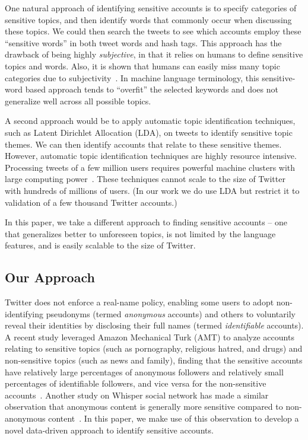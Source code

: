 \documentclass[conference]{IEEEtran}
\begin{document}
One natural approach of identifying sensitive accounts is to specify categories of sensitive topics, and then identify words that commonly occur when discussing these topics. We could then search the tweets to see which accounts employ
these ``sensitive words'' in both tweet words and hash tags. This approach has the drawback of being highly \textit{subjective}, in that it relies on humans to define sensitive topics and words. Also, it is shown that humans can easily miss many topic categories due to subjectivity~\cite{Peddinti2014}.
In machine language terminology, this sensitive-word based approach tends to ``overfit'' the selected keywords and does not generalize well across all possible topics.

A second approach would be to apply automatic topic identification techniques, such as Latent Dirichlet Allocation (LDA), on tweets to identify sensitive topic themes. We can then identify accounts that relate to these sensitive themes. 
However, automatic topic identification techniques are highly resource intensive. Processing tweets of a few million users requires powerful machine clusters with large computing power~\cite{HsiangFuYuWWW2015,BinbiWSDM2014}. These techniques cannot scale to the size of Twitter with hundreds of millions of users. (In our work we do use LDA but restrict it to validation of a few thousand Twitter accounts.)

In this paper, we take a different approach to finding sensitive accounts -- one that generalizes better to unforeseen topics, is not limited by the language features, and is easily scalable to the size of Twitter.

\subsection{Our Approach}

Twitter does not enforce a real-name policy, enabling some users to adopt non-identifying pseudonyms (termed \textit{anonymous} accounts) and others to voluntarily reveal their identities by disclosing their full names (termed {\em identifiable} accounts).
A recent study leveraged Amazon Mechanical Turk (AMT) to analyze  accounts relating to sensitive topics (such as pornography, religious hatred, and drugs) and non-sensitive topics (such as news and family), finding that the sensitive accounts  have relatively large percentages of anonymous followers and relatively small percentages of identifiable followers, and vice versa for the non-sensitive accounts~\cite{PeddintiCOSN2014}.
Another study on Whisper social network has made a similar observation that anonymous content is generally more sensitive compared to non-anonymous content~\cite{correa2015whisper}.
In this paper, we make use of this observation to develop a novel data-driven approach to identify sensitive accounts. 
\end{document}
